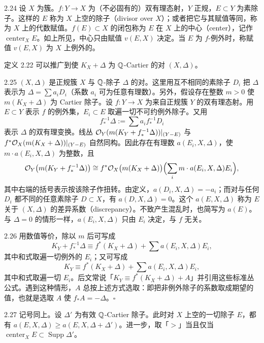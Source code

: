 \begin{definition}{2.24}
设 $X$ 为簇。$f\colon Y\to X$ 为（不必固有的）双有理态射，$Y$ 正规，$E\subset Y$ 为素除子。这样的 $E$ 称为 $X$ 上空的除子（divisor over $X$）；或者把它与其赋值等同，称为 $X$ 上的代数赋值。$f(E)\subset X$ 的闭包称为 $E$ 在 $X$ 上的中心（center），记作 $\operatorname{center}_XE$。如上所见，中心只由赋值 $v(E,X)$ 决定。当 $E$ 为 $f$-例外时，称赋值 $v(E,X)$ 为 $X$ 上例外的。
\end{definition}

定义 2.22 可以推广到使 $K_X+\Delta$ 为 $\mathbb{Q}$-Cartier 的对 $(X,\Delta)$。

\begin{definition}{2.25}
$(X,\Delta)$ 是正规簇 $X$ 与 $\mathbb{Q}$-除子 $\Delta$ 的对。这里用互不相同的素除子 $D_i$ 把 $\Delta$ 表示为 $\Delta=\sum a_iD_i$（系数 $a_i$ 可为任意有理数）。另外，假设存在整数 $m>0$ 使 $m(K_X+\Delta)$ 为 Cartier 除子。设 $f\colon Y\to X$ 为来自正规簇 $Y$ 的双有理态射。用 $E\subset Y$ 表示 $f$ 的例外集，$E_i\subset E$ 取遍一切不可约例外除子。又用
\[
f_*^{-1}\Delta:=\sum a_i f_*^{-1}D_i
\]
表示 $\Delta$ 的双有理变换。线丛 $\mathcal{O}_Y(m(K_Y+f_*^{-1}\Delta))|_{(Y-E)}$ 与 $f^*\mathcal{O}_X(m(K_X+\Delta))|_{(Y-E)}$ 自然同构。因此存在有理数 $a(E_i,X,\Delta)$，使 $m\cdot a(E_i,X,\Delta)$ 为整数，且
\[
\mathcal{O}_Y\bigl(m(K_Y+f_*^{-1}\Delta)\bigr)\cong f^*\mathcal{O}_X\bigl(m(K_X+\Delta)\bigr)\Bigl(\sum_i m\cdot a(E_i,X,\Delta)E_i\Bigr),
\]
其中右端的括号表示按该除子作扭转。由定义，$a(D_i,X,\Delta)=-a_i$；而对与任何 $D_i$ 都不同的任意素除子 $D\subset X$，有 $a(D,X,\Delta)=0$。这个 $a(E,X,\Delta)$ 称为 $E$ 关于 $(X,\Delta)$ 的差异系数（discrepancy）。不致产生混乱时，也简写为 $a(E)$。
与 $\Delta=0$ 的情形一样，$a(E_i,X,\Delta)$ 只由 $E_i$ 决定，与 $f$ 无关。
\end{definition}

\begin{notation}{2.26}
用数值等价，除以 $m$ 后可写成
\[
K_Y+f_*^{-1}\Delta\equiv f^*(K_X+\Delta)+\sum a(E_i,X,\Delta)E_i,
\]
其中和式取遍一切例外的 $E_i$；又可写成
\[
K_Y\equiv f^*(K_X+\Delta)+\sum a(E_i,X,\Delta)E_i,
\]
其中和式取遍一切 $E_i$。后文常说「$K_Y\equiv f^*(K_X+\Delta)+A$」并引用这些标准丛公式。遇到这种情形，$A$ 总按上述方式选取：即把非例外除子的系数取成期望的值，也就是选取 $A$ 使 $f_*A=-\Delta$。\hfill$\square$
\end{notation}

\begin{lemma}{2.27}
记号同上。设 $\Delta'$ 为有效 $\mathbb{Q}$-Cartier 除子。此时对 $X$ 上空的一切除子 $E$，都有 $a(E,X,\Delta)\ge a(E,X,\Delta+\Delta')$。进一步，取「$>$」当且仅当 $\operatorname{center}_XE\subset\operatorname{Supp}\Delta'$。
\end{lemma}


